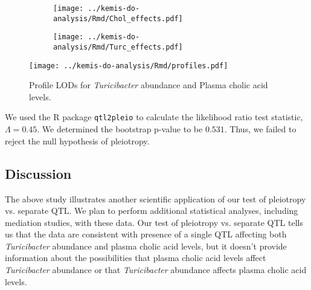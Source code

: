 \documentclass{book}
\begin{document}
\begin{figure}

\begin{subfigure}[b]{\textwidth}
\centering
\texttt{[image: ../kemis-do-analysis/Rmd/Chol\_effects.pdf]}
\subcaption{}
\end{subfigure}

\begin{subfigure}[b]{\textwidth}
\centering
\texttt{[image: ../kemis-do-analysis/Rmd/Turc\_effects.pdf]}
\subcaption{}
\end{subfigure}
\caption{}
\end{figure}




\begin{figure}
\texttt{[image: ../kemis-do-analysis/Rmd/profiles.pdf]}
\caption{Profile LODs for \emph{Turicibacter} abundance and Plasma cholic acid levels.}
\end{figure}



We used the R package \texttt{qtl2pleio} \citep{qtl2pleio} to calculate the likelihood ratio test statistic, $\Lambda = 0.45$. We determined the bootstrap p-value to be $0.531$. Thus, we failed to reject the null hypothesis of pleiotropy.


\subsection{Discussion}

The above study illustrates another scientific application of our test of pleiotropy vs. separate QTL. We plan to perform additional statistical analyses, including mediation studies, with these data. Our test of pleiotropy vs. separate QTL tells us that the data are consistent with presence of a single QTL affecting both \emph{Turicibacter} abundance and plasma cholic acid levels, but it doesn't provide information about the possibilities that plasma cholic acid levels affect \emph{Turicibacter} abundance or that \emph{Turicibacter} abundance affects plasma cholic acid levels.
\end{document}
